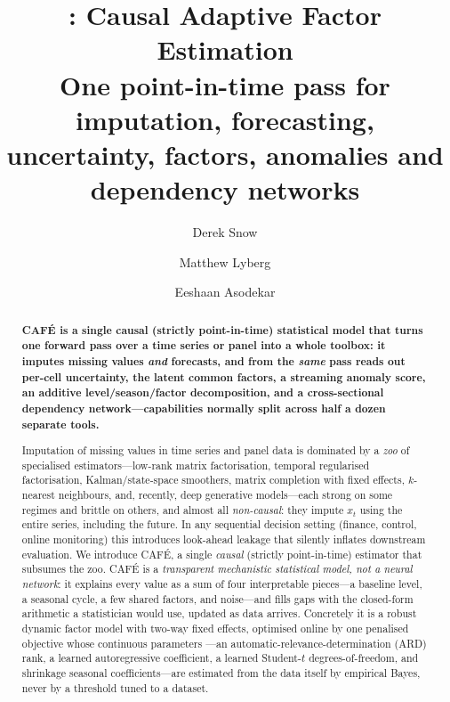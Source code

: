 \documentclass[10pt,twocolumn]{article}
\title{\textbf{\cafe{}: Causal Adaptive Factor Estimation}\\[4pt]
  {\large\normalfont One point-in-time pass for imputation, forecasting,\\
   uncertainty, factors, anomalies and dependency networks}}
\author[1]{Derek Snow}
\author[2]{Matthew Lyberg}
\author[2]{Eeshaan Asodekar}
\affil[1]{Sovai Research \quad \texttt{d.snow@sov.ai}}
\affil[2]{Manulife Wealth \& Asset Management \quad \texttt{\{matthew\_lyberg,\,eshaan\_asodekar\}@manulifeam.com}}
\date{}
\newcommand{\cafe}{CAF\'E}
\begin{document}
\maketitle

\begin{abstract}
\noindent
\textbf{\cafe{} is a single causal (strictly point-in-time) statistical model
that turns one forward pass over a time series or panel into a whole toolbox: it
imputes missing values \emph{and} forecasts, and from the \emph{same} pass reads
out per-cell uncertainty, the latent common factors, a streaming anomaly score,
an additive level/season/factor decomposition, and a cross-sectional dependency
network---capabilities normally split across half a dozen separate tools.}

Imputation of missing values in time series and panel data is dominated by a
\emph{zoo} of specialised estimators---low-rank matrix factorisation, temporal
regularised factorisation, Kalman/state-space smoothers, matrix completion with
fixed effects, $k$-nearest neighbours, and, recently, deep generative
models---each strong on some regimes and brittle on others, and almost all
\emph{non-causal}: they impute $x_t$ using the entire series, including the
future. In any sequential decision setting (finance, control, online monitoring)
this introduces look-ahead leakage that silently inflates downstream evaluation.
We introduce \cafe{}, a single \emph{causal} (strictly point-in-time) estimator
that subsumes the zoo. \cafe{} is a \emph{transparent mechanistic statistical
model, not a neural network}: it explains every value as a sum of four
interpretable pieces---a baseline level, a seasonal cycle, a few shared factors,
and noise---and fills gaps with the closed-form arithmetic a statistician would
use, updated as data arrives. Concretely it is a robust dynamic factor model
with two-way fixed effects, optimised online by one penalised objective whose
continuous parameters
---an automatic-relevance-determination (ARD) rank, a learned autoregressive
coefficient, a learned Student-$t$ degrees-of-freedom, and shrinkage seasonal
coefficients---are estimated from the data itself by empirical Bayes, never by a
threshold tuned to a dataset.


\end{abstract}
\end{document}
